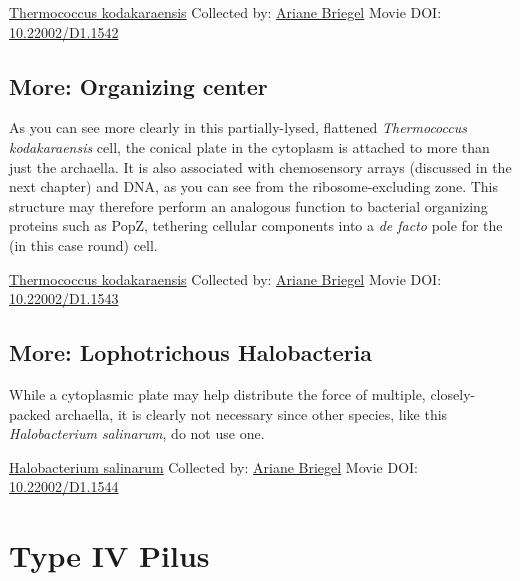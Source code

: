 \documentclass[]{tufte-book}
\begin{document}
\label{fig:6-9a}\protect\hyperlink{tree}{Thermococcus kodakaraensis} Collected by: \protect\hyperlink{ariane_briegel}{Ariane Briegel} Movie DOI: \href{https://doi.org/10.22002/D1.1542}{10.22002/D1.1542}

\hypertarget{Organizing_center}{%
\subsection*{More: Organizing center}\label{Organizing_center}}

As you can see more clearly in this partially-lysed, flattened \emph{Thermococcus kodakaraensis} cell, the conical plate in the cytoplasm is attached to more than just the archaella. It is also associated with chemosensory arrays (discussed in the next chapter) and DNA, as you can see from the ribosome-excluding zone. This structure may therefore perform an analogous function to bacterial organizing proteins such as PopZ, tethering cellular components into a \emph{de facto} pole for the (in this case round) cell.



\hypertarget{htmlwidget-24f2b71ebde0967d42aa}{}

\label{fig:6-9b}\protect\hyperlink{tree}{Thermococcus kodakaraensis} Collected by: \protect\hyperlink{ariane_briegel}{Ariane Briegel} Movie DOI: \href{https://doi.org/10.22002/D1.1543}{10.22002/D1.1543}

\hypertarget{Lophotrichous_Halobacteria}{%
\subsection*{More: Lophotrichous Halobacteria}\label{Lophotrichous_Halobacteria}}

While a cytoplasmic plate may help distribute the force of multiple, closely-packed archaella, it is clearly not necessary since other species, like this \emph{Halobacterium salinarum}, do not use one.



\hypertarget{htmlwidget-dd1bca55bf0c8647e76d}{}

\label{fig:6-9c}\protect\hyperlink{tree}{Halobacterium salinarum} Collected by: \protect\hyperlink{ariane_briegel}{Ariane Briegel} Movie DOI: \href{https://doi.org/10.22002/D1.1544}{10.22002/D1.1544}

\hypertarget{type-iv-pilus}{%
\section{Type IV Pilus}\label{type-iv-pilus}}
\end{document}
